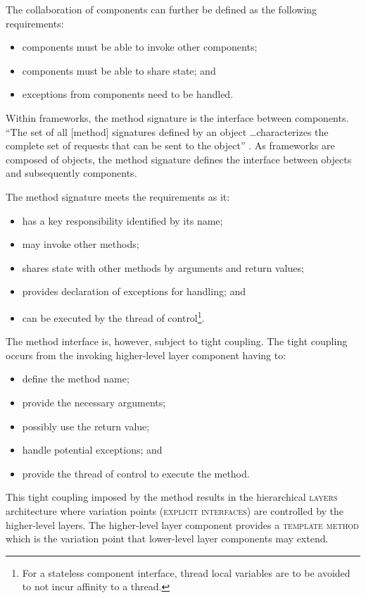 \documentclass[prodmode]{style/acmlarge}
\begin{document}
The collaboration of components can further be defined as the following
requirements:
\begin{itemize}
  \item components must be able to invoke other components;
  \item components must be able to share state; and
  \item exceptions from components need to be handled.
\end{itemize}

Within frameworks, the method signature is the interface between components.
``The set of all [method] signatures defined by an object \ldots characterizes
the complete set of requests that can be sent to the object'' \cite[p. 13]{gof}.
As frameworks are composed of objects, the method signature defines the
interface between objects and subsequently components.

The method signature meets the requirements as it:
\begin{itemize}
  \item has a key responsibility identified by its name;
  \item may invoke other methods;
  \item shares state with other methods by arguments and return values;
  \item provides declaration of exceptions for handling; and
  \item can be executed by the thread of control\footnote{For a stateless component interface, thread local variables are to be avoided to not incur affinity to a thread.}.
\end{itemize}

The method interface is, however, subject to tight coupling.  The tight
coupling occurs from the invoking higher-level layer component having to:
\begin{itemize}
  \item define the method name;
  \item provide the necessary arguments;
  \item possibly use the return value;
  \item handle potential exceptions; and
  \item provide the thread of control to execute the method.
\end{itemize}

This tight coupling imposed by the method results in the hierarchical
\textsc{layers} architecture where variation points (\textsc{explicit
interfaces}) are controlled by the higher-level layers.  The higher-level layer
component provides a \textsc{template method} \cite{gof} which is the variation
point that lower-level layer components may extend.
\end{document}
